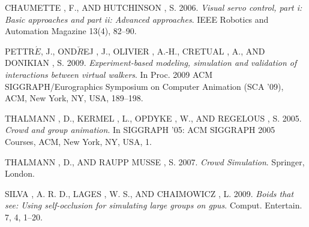 \documentclass[11pt]{article}
\begin{document}
\begin{thebibliography}{2} 

\label{CHAUMETTE AND HUTCHINSON (2006)}
CHAUMETTE , F., AND HUTCHINSON , S. 2006.
\textit{Visual servo control, part i: Basic approaches and part ii: Advanced approaches}. IEEE Robotics and Automation Magazine 13(4), 82–90.

\label{Pettre and Ondrej (2009)}
PETTR$\acute{E}$, J., OND$\breve{R}$EJ , J., OLIVIER , A.-H., CRETUAL , A., AND DONIKIAN , S. 2009.
\textit{Experiment-based modeling, simulation
and validation of interactions between virtual walkers}.
In Proc.
2009 ACM SIGGRAPH/Eurographics Symposium on Computer
Animation (SCA ’09), ACM, New York, NY, USA, 189–198.

\label{THALMANN et al. (2005)}
THALMANN , D., KERMEL , L., OPDYKE , W., AND REGELOUS ,
S. 2005.
\textit{Crowd and group animation}.
In SIGGRAPH ’05: ACM
SIGGRAPH 2005 Courses, ACM, New York, NY, USA, 1.

\label{THALMANN and MUSSE (2007)}
THALMANN , D., AND RAUPP MUSSE , S. 2007.
\textit{Crowd Simulation}.
Springer, London.

\label{SILVA et al. (2009)}
SILVA , A. R. D., LAGES , W. S., AND CHAIMOWICZ , L. 2009.
\textit{Boids that see: Using self-occlusion for simulating large groups on gpus}. Comput. Entertain. 7, 4, 1–20.




\end{thebibliography}
\end{document}

